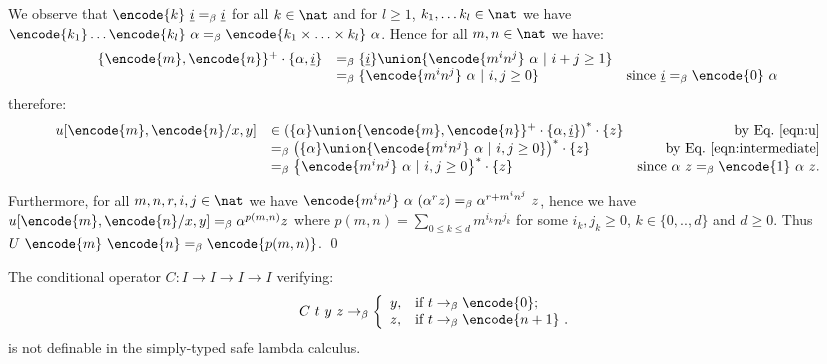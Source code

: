 We observe that $\encode{k}~\underline{i} =_\beta \underline{i}$ for
all $k \in \nat$ and for $l\geq 1$, $k_1, \ldots k_l \in \nat$ we
have $\encode{k_1}\ldots \encode{k_l}~\alpha =_\beta
\encode{k_1\times \ldots \times k_l}~\alpha$. Hence for all $m,n \in
\nat$ we have:
\begin{equation}
\begin{array}{llr}
\{\encode{m},\encode{n}\}^+ \cdot \{\alpha, \underline{i} \} &=_\beta
\{ \underline{i} \} \union
\{ \encode{m^i  n^j}~\alpha \ |\ i+j \geq 1 \} \nonumber \\
&=_\beta \{ \encode{m^i  n^j}~\alpha \ |\ i,j \geq 0 \} & \mbox{since } \underline{i} =_\beta \encode{0}~\alpha \end{array}
\label{eqn:intermediate}
\end{equation}
therefore:
$$\begin{array}{llr}
u[\encode{m}, \encode{n}/x,y] &\in \left( \{ \alpha \} \union \{\encode{m},\encode{n}\}^+ \cdot \{\alpha, \underline{i} \} \right)^* \cdot \{ z \}  & \mbox{by Eq.\ \ref{eqn:u}} \\
&=_\beta \left( \{\alpha \} \union \{ \encode{m^i n^j}~
\alpha \ | \ i,j \geq 0 \} \right)^* \cdot \{ z \} & \mbox{by Eq.\ \ref{eqn:intermediate}}  \\
&=_\beta \left\{ \encode{m^i n^j}~
\alpha \ | \ i,j \geq 0 \right\}^* \cdot \{ z \} & \mbox{since $\alpha~z =_\beta \encode{1}~\alpha~z$}.
\end{array}$$

Furthermore, for all $m,n,r,i,j\in \nat$ we have $\encode{m^i n^j}
~\alpha~(\alpha^r z) =_\beta \alpha^{r + m^i n^j}~z$, hence we have
$u[\encode{m},\encode{n}/x,y] =_\beta \alpha^{p(m,n)} z$ where
$p(m,n) = \sum_{0\leq k \leq d} m^{i_k} n^{j_k}$ for some $i_k,j_k
\geq 0$, $k \in\{ 0,..,d \}$ and $d\geq 0$. Thus $U~\encode{m}
~\encode{n} =_\beta \encode{p(m,n)}$. \qed

\begin{corollary}
The conditional operator $C:I\rightarrow I\rightarrow I \rightarrow
I$ verifying:
$$
C~t~y~z \rightarrow_\beta \left\{
                            \begin{array}{ll}
                              y, & \hbox{if $t
\rightarrow_\beta \encode{0}$;} \\
                              z, & \hbox{if
$t \rightarrow_\beta \encode{n+1}$ .}
                            \end{array}
                          \right.
$$
is not definable in the simply-typed safe lambda calculus.
\end{corollary}

